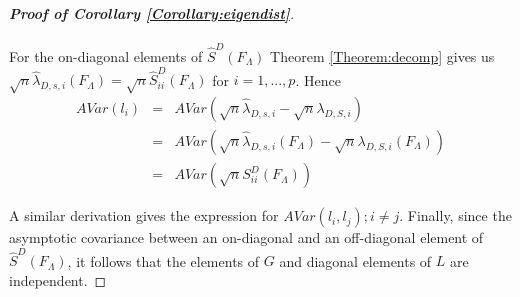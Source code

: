 \documentclass[fleqn,12pt]{article}
\begin{document}
\begin{proof}[\textbf{Proof of Corollary \ref{Corollary:eigendist}}]
\paragraph{}For the on-diagonal elements of $\hat S^D(F_\Lambda)$ Theorem \ref{Theorem:decomp} gives us $ \sqrt n \hat\lambda_{D,s,i} (F_\Lambda) = \sqrt n \hat S^D_{ii}(F_\Lambda)$ for $i = 1,...,p$. Hence
\begin{eqnarray*}
AVar(l_i) &=& AVar(\sqrt n \hat\lambda_{D,s,i} - \sqrt n \lambda_{D,S,i})\\
&=& AVar(\sqrt n \hat\lambda_{D,s,i} (F_\Lambda) - \sqrt n \lambda_{D,S,i}(F_\Lambda))\\
&=& AVar(\sqrt n S^D_{ii}(F_\Lambda))
\end{eqnarray*}

A similar derivation gives the expression for $AVar(l_i,l_j); i \neq j$. Finally, since the asymptotic covariance between an on-diagonal and an off-diagonal element of $\hat S^D(F_\Lambda)$, it follows that the elements of $G$ and diagonal elements of $L$ are independent.
\end{proof}



\end{document}
